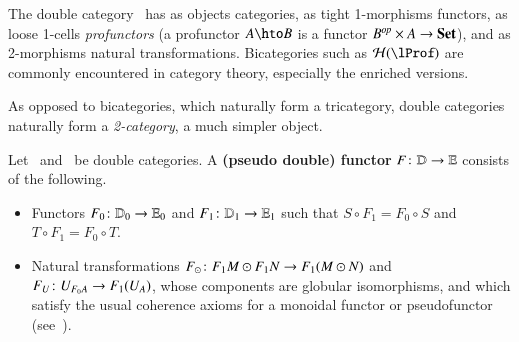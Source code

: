 \begin{eg}
  The double category \lProf\ has as objects categories, as
  tight 1-morphisms functors, as loose 1-cells \emph{profunctors} (a profunctor
  $A\hto B$ is a functor $B^{\mathit{op}}\times A\to \mathbf{Set}$), and as
  2-morphisms natural transformations.  Bicategories such as
  $\cH(\lProf)$ are commonly encountered in category theory,
  especially the enriched versions.
\end{eg}


As opposed to bicategories, which naturally form a tricategory, double
categories naturally form a \emph{2-category}, a much simpler object.

\begin{defn}
  Let \lD\ and \lE\ be double categories.  A \textbf{(pseudo double)
    functor} $F\colon \mathbb{D}\to \mathbb{E}$ consists of the following.
  \begin{itemize}
  \item Functors $F_0\colon \mathbb{D}_0 \to \mathbb{E}_0$ and $F_1\colon \mathbb{D}_1 \to
    \mathbb{E}_1$ such that $S\circ F_1 = F_0\circ S$ and $T\circ F_1 =
    F_0\circ T$.
  \item Natural transformations $F_\odot\colon F_1M \odot F_1N \to
    F_1(M\odot N)$ and $F_U\colon U_{F_0 A} \to F_1(U_A)$, whose
    components are globular isomorphisms, and which satisfy the usual
    coherence axioms for a monoidal functor or pseudofunctor
    (see~\cite[\S{}XI.2]{maclane}).
  \end{itemize}
\end{defn}

